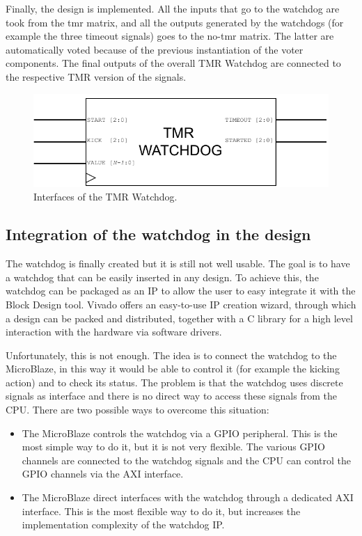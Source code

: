 Finally, the design is implemented. All the inputs that go to the watchdog are took from the tmr matrix, and all the outputs generated by the watchdogs (for example the three timeout signals) goes to the no-tmr matrix. The latter are automatically voted because of the previous instantiation of the voter components. The final outputs of the overall TMR Watchdog are connected to the respective TMR version of the signals.

\begin{figure}[H]
\centering
\includegraphics[width=0.7\linewidth]{images/chapter4/wd_tmr.pdf}
\caption{Interfaces of the TMR Watchdog.}
\label{fig:wd_tmr}
\end{figure}


\subsection{Integration of the watchdog in the design}

The watchdog is finally created but it is still not well usable. The goal is to have a watchdog that can be easily inserted in any design. To achieve this, the watchdog can be packaged as an IP to allow the user to easy integrate it with the Block Design tool. Vivado offers an easy-to-use IP creation wizard, through which a design can be packed and distributed, together with a C library for a high level interaction with the hardware via software drivers.\bigskip

Unfortunately, this is not enough. The idea is to connect the watchdog to the MicroBlaze, in this way it would be able to control it (for example the kicking action) and to check its status. The problem is that the watchdog uses discrete signals as interface and there is no direct way to access these signals from the CPU. There are two possible ways to overcome this situation:

\begin{itemize}
    \item The MicroBlaze controls the watchdog via a GPIO peripheral. This is the most simple way to do it, but it is not very flexible. The various GPIO channels are connected to the watchdog signals and the CPU can control the GPIO channels via the AXI interface.
    \item The MicroBlaze direct interfaces with the watchdog through a dedicated AXI interface. This is the most flexible way to do it, but increases the implementation complexity of the watchdog IP.
\end{itemize}

